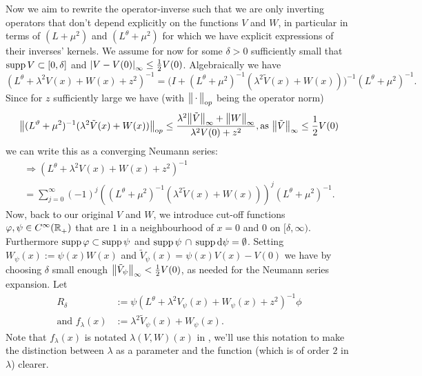 Now we aim to rewrite the operator-inverse such that we are only inverting
operators that don't depend explicitly on the functions $V$ and $W$, in
particular in terms of $(L+\mu^2)$ and $(L^\theta+\mu^2)$ for which we have
explicit expressions of their inverses' kernels. We assume for now for some
$\delta > 0$ sufficiently small that $\operatorname{supp} V \subset [0,\delta]$ and
$\left|V-V(0)\right|_{\infty}\leq \frac12V(0)$. Algebraically we have
\begin{equation*}
  (L^\theta + \lambda^2 V(x) + W(x) + z^2)^{-1} =
    \bigl(I + (L^\theta + \mu^2)^{-1}(\lambda^2\tilde V(x) + W(x))\bigr)^{-1}
    (L^\theta + \mu^2)^{-1}.
\end{equation*}
Since for $z$ sufficiently large we have (with $\bigl\|\,\cdot\,\bigr\|_{\mathrm op}$ being the
operator norm)
\begin{align*}
  \bigl\|(L^\vartheta + \mu^2)^{-1}(\lambda^2\tilde V(x) + W(x))\bigr\|_{\mathrm op} \leq
  \frac{\lambda^2\bigl\|\tilde V\bigr\|_{\infty} + \bigl\|W\bigr\|_{\infty}}{\lambda^2 V(0) + z^2},
  \text{as } \bigl\|\tilde V\bigr\|_{\infty} \leq \frac12V(0)
\end{align*}
we can write this as a converging Neumann series:
\begin{multline}
  \label{frm:neumann-sum}
  \Rightarrow (L^\theta + \lambda^2 V(x) + W(x) + z^2)^{-1} \\ =
    \sum_{j=0}^\infty (-1)^j \left((L^\theta + \mu^2)^{-1}(\lambda^2\tilde V(x)
    + W(x))\right)^j (L^\theta + \mu^2)^{-1}.
\end{multline}
Now, back to our original $V$ and $W$, we introduce cut-off functions $\varphi,
\psi\in C^\infty_{}({\mathbb{R}_+^{}})$ that are $1$ in a neighbourhood of $x = 0$ and $0$ on
$[\delta,\infty)$. Furthermore $\operatorname{supp}\varphi\subset\operatorname{supp}\psi$ and
$\operatorname{supp}\psi\,\cap\,\operatorname{supp}\mathrm d\psi = \emptyset$. Setting $W_\psi(x) :=
\psi(x)W(x)$ and $\tilde V_\psi(x) = \psi(x)V(x) - V(0)$ we have by choosing
$\delta$ small enough $\bigl\|\tilde V_\psi\bigr\|_{\infty} < \frac12V(0)$, as needed for the
Neumann series expansion. Let
\begin{align}
  \label{frm:r-delta}
  R_\delta &:= \psi(L^\theta + \lambda^2V_\psi(x) + W_\psi(x) + z^2)^{-1}\phi \\
  \label{frm:f-lambda}
  \text{and } f_\lambda(x) &:= \lambda^2\tilde V_\psi(x) + W_\psi(x).
\end{align}
Note that $f_\lambda(x)$ is notated $\lambda(V,W)(x)$ in \cite{LV13}, we'll use
this notation to make the distinction between $\lambda$ as a parameter and the
function (which is of order $2$ in $\lambda$) clearer.

